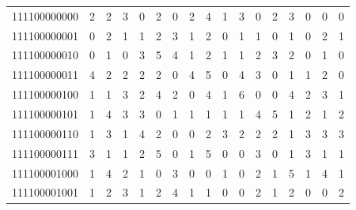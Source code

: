 \documentclass[10pt,a4paper]{article}
\begin{document}
\begin{longtable}{ |c|c|c|c|c|c|c|c|c|c|c|c|c|c|c|c|c| }
    111100000000              & 2                            & 2                                & 3                            & 0                              & 2   & 0   & 2   & 4   & 1   & 3   & 0   & 2   & 3   & 0   & 0   & 0   \\
    111100000001              & 0                            & 2                                & 1                            & 1                              & 2   & 3   & 1   & 2   & 0   & 1   & 1   & 0   & 1   & 0   & 2   & 1   \\
    111100000010              & 0                            & 1                                & 0                            & 3                              & 5   & 4   & 1   & 2   & 1   & 1   & 2   & 3   & 2   & 0   & 1   & 0   \\
    111100000011              & 4                            & 2                                & 2                            & 2                              & 2   & 0   & 4   & 5   & 0   & 4   & 3   & 0   & 1   & 1   & 2   & 0   \\
    111100000100              & 1                            & 1                                & 3                            & 2                              & 4   & 2   & 0   & 4   & 1   & 6   & 0   & 0   & 4   & 2   & 3   & 1   \\
    111100000101              & 1                            & 4                                & 3                            & 3                              & 0   & 1   & 1   & 1   & 1   & 1   & 4   & 5   & 1   & 2   & 1   & 2   \\
    111100000110              & 1                            & 3                                & 1                            & 4                              & 2   & 0   & 0   & 2   & 3   & 2   & 2   & 2   & 1   & 3   & 3   & 3   \\
    111100000111              & 3                            & 1                                & 1                            & 2                              & 5   & 0   & 1   & 5   & 0   & 0   & 3   & 0   & 1   & 3   & 1   & 1   \\
    111100001000              & 1                            & 4                                & 2                            & 1                              & 0   & 3   & 0   & 0   & 1   & 0   & 2   & 1   & 5   & 1   & 4   & 1   \\
    111100001001              & 1                            & 2                                & 3                            & 1                              & 2   & 4   & 1   & 1   & 0   & 0   & 2   & 1   & 2   & 0   & 0   & 2   \\

\end{longtable}
\end{document}
